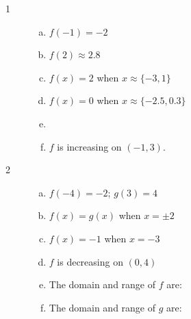 \documentclass[letterpaper, landscape]{exam}
\begin{document}
    \begin{description}

      \item[1]
        \begin{enumerate}[(a)]
          \item $f(-1) = \boxed{ -2 }$
          \item $f(2) \approx \boxed{ 2.8 }$
          \item $f(x) = 2$ when $\boxed{ x \approx \{-3, 1 \} }$
          \item $f(x) = 0$ when $\boxed{ x \approx \{ -2.5, 0.3 \} }$
          \item 

          \item $f$ is increasing on $(-1, 3)$.
        \end{enumerate}

      \item[2]
        \begin{enumerate}[(a)]
          \item $f(-4) = \boxed{ -2 }$; $g(3) = \boxed{ 4 }$

          \item $f(x) = g(x)$ when $x = \boxed{ \pm 2 }$

          \item $f(x) = -1$ when $x = \boxed{ -3 }$

          \item $f$ is decreasing on $\boxed{ (0, 4) }$

          \item 
            The domain and range of $f$ are:

          \item 
            The domain and range of $g$ are:
        \end{enumerate}


\end{description}
\end{document}
